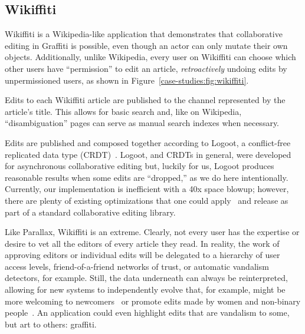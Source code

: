 


\subsection{Wikiffiti}

Wikiffiti is a Wikipedia-like application that demonstrates that
collaborative editing in Graffiti is possible,
even though an actor can only mutate their own objects.
Additionally, unlike Wikipedia,
every user on Wikiffiti can choose which other users have ``permission'' to edit an article,
\emph{retroactively} undoing edits by unpermissioned users,
as shown in Figure~\ref{case-studies:fig:wikiffiti}.

Edits to each Wikiffiti article are published to
the channel represented by the article's title.
This allows for basic search and, like on Wikipedia,
``disambiguation'' pages can serve as manual search indexes when necessary.

Edits are published and composed together according to Logoot,
a conflict-free replicated data type (CRDT)~\cite{logoot,crdts}.
Logoot, and CRDTs in general, were developed for asynchronous collaborative editing
but, luckily for us, Logoot produces reasonable results when
some edits are ``dropped,'' as we do here intentionally.
Currently, our implementation is inefficient with a 40x space blowup;
however, there are plenty of existing optimizations that one could apply~\cite{logootbetter}
and release as part of a standard collaborative editing library.

Like Parallax, Wikiffiti is an extreme. Clearly, not every user
has the expertise or desire to vet all the editors of
every article they read. In reality, the work of approving editors
or individual edits will be delegated to
a hierarchy of user access levels,
friend-of-a-friend networks of trust,
or automatic vandalism detectors, for example.
Still, the data underneath can always be reinterpreted, allowing
for new systems to independently evolve that,
for example, might be more welcoming to newcomers~\cite{wikibourgeoisie, wikirisedecline}
or promote edits made by women and non-binary people~\cite{wikigender}.
An application could even highlight edits that are vandalism to some,
but art to others: graffiti.




